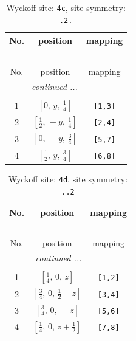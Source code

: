 \documentclass[fleqn,8pt]{jsarticle}
\begin{document}
\renewcommand{\arraystretch}{1.2}
\begin{longtable}{ccc}
\caption{Wyckoff site: {\tt 4c}, site symmetry: {\tt .2.}}
 \\
 \hline \hline
No. & position & mapping \\ \hline \endfirsthead

\multicolumn{2}{l}{\tablename\ \thetable{}} \\
 \hline \hline
No. & position & mapping \\ \hline \endhead

 \hline \hline
\multicolumn{2}{r}{\footnotesize\it continued ...} \\ \endfoot

 \hline \hline
\multicolumn{2}{r}{} \\ \endlastfoot

1 & $\left[ 0,\, y,\, \frac{1}{4} \right]$ & {\tt [1,3]} \\ \hline
2 & $\left[ \frac{1}{2},\, - y,\, \frac{1}{4} \right]$ & {\tt [2,4]} \\ \hline
3 & $\left[ 0,\, - y,\, \frac{3}{4} \right]$ & {\tt [5,7]} \\ \hline
4 & $\left[ \frac{1}{2},\, y,\, \frac{3}{4} \right]$ & {\tt [6,8]} \\
\end{longtable}
\renewcommand{\arraystretch}{1.2}
\begin{longtable}{ccc}
\caption{Wyckoff site: {\tt 4d}, site symmetry: {\tt ..2}}
 \\
 \hline \hline
No. & position & mapping \\ \hline \endfirsthead

\multicolumn{2}{l}{\tablename\ \thetable{}} \\
 \hline \hline
No. & position & mapping \\ \hline \endhead

 \hline \hline
\multicolumn{2}{r}{\footnotesize\it continued ...} \\ \endfoot

 \hline \hline
\multicolumn{2}{r}{} \\ \endlastfoot

1 & $\left[ \frac{1}{4},\, 0,\, z \right]$ & {\tt [1,2]} \\ \hline
2 & $\left[ \frac{3}{4},\, 0,\, \frac{1}{2} - z \right]$ & {\tt [3,4]} \\ \hline
3 & $\left[ \frac{3}{4},\, 0,\, - z \right]$ & {\tt [5,6]} \\ \hline
4 & $\left[ \frac{1}{4},\, 0,\, z + \frac{1}{2} \right]$ & {\tt [7,8]} \\
\end{longtable}
\end{document}
